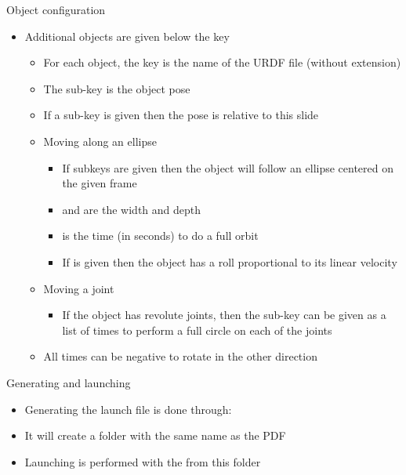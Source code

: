 \documentclass{ecnbeamer}
\begin{document}
\begin{frame}{Object configuration}
\begin{itemize}
 \item Additional objects are given below the  key
 \begin{itemize}
  \item For each object, the key is the name of the URDF file (without extension)
  \item The  sub-key is the object pose
  \item If a  sub-key is given then the pose is relative to this slide\vfill
  \item Moving along an ellipse
  \begin{itemize}
   \item If subkeys  are given then the object will follow an ellipse centered on the given frame
   \item {} and  are the width and depth
   \item {} is the time (in seconds) to do a full orbit
   \item If  is given then the object has a roll proportional to its linear velocity
  \end{itemize}\vfill
  \item Moving a joint
  \begin{itemize}
   \item If the object has revolute joints, then the  sub-key can be given as a list of times to perform a full circle on each of the joints
  \end{itemize}\vfill
  \item All times can be negative to rotate in the other direction
 \end{itemize}
\end{itemize}
\end{frame}

\begin{frame}{Generating and launching}
 \begin{itemize}
  \item Generating the launch file is done through:\\
  \vfill
  \item It will create a folder with the same name as the PDF\vfill
  \item Launching is performed with the  from this folder\\
  
 \end{itemize}

\end{frame}
\end{document}
